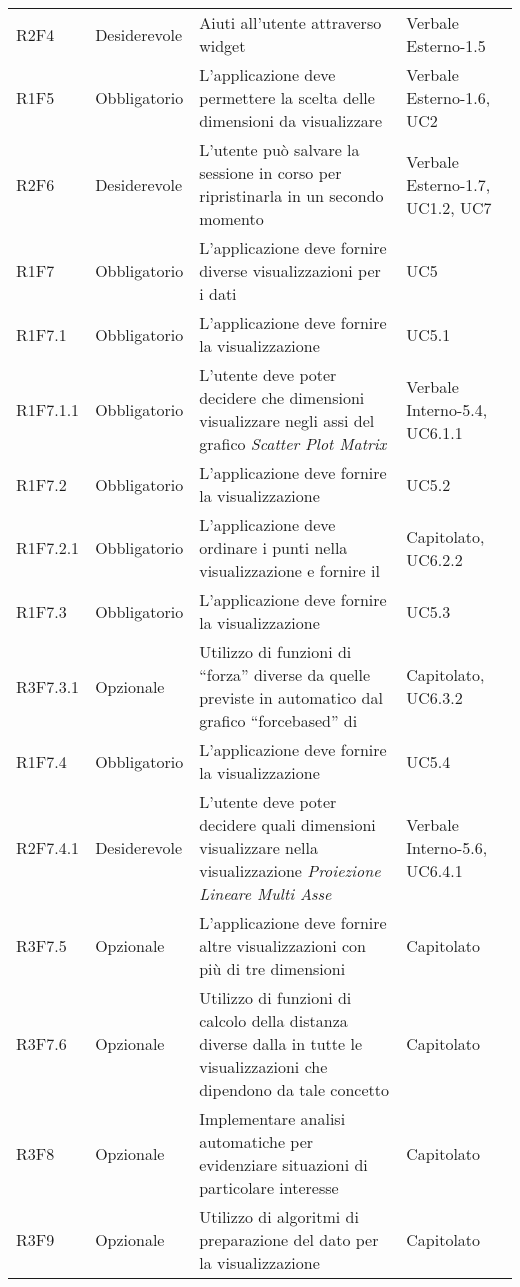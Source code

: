 \begin{center}
\begin{longtable}{C{2cm} | C{3cm} | C{7cm} | C{3.3cm}}
R2F4 & Desiderevole & Aiuti all'utente attraverso widget & Verbale Esterno-1.5 \\
R1F5 & Obbligatorio & L'applicazione deve permettere la scelta delle dimensioni da visualizzare & Verbale Esterno-1.6, UC2\\
R2F6 & Desiderevole & L'utente può salvare la sessione in corso per ripristinarla in un secondo momento & Verbale Esterno-1.7, UC1.2, UC7\\
R1F7 & Obbligatorio & L'applicazione deve fornire diverse visualizzazioni per i dati & UC5\\
R1F7.1 & Obbligatorio & L'applicazione deve fornire la visualizzazione  & UC5.1\\
R1F7.1.1 & Obbligatorio & L'utente deve poter decidere che dimensioni visualizzare negli assi del grafico \textit{Scatter Plot Matrix} & Verbale Interno-5.4, UC6.1.1\\
R1F7.2 & Obbligatorio & L'applicazione deve fornire la visualizzazione  & UC5.2\\
R1F7.2.1 & Obbligatorio & L'applicazione deve ordinare i punti nella visualizzazione  e fornire il  & Capitolato, UC6.2.2 \\
R1F7.3 & Obbligatorio & L'applicazione deve fornire la visualizzazione  & UC5.3\\
R3F7.3.1 & Opzionale & Utilizzo di funzioni di “forza” diverse da quelle previste in automatico dal grafico “forcebased” di  & Capitolato, UC6.3.2\\
R1F7.4 & Obbligatorio & L'applicazione deve fornire la visualizzazione  & UC5.4 \\
R2F7.4.1 & Desiderevole & L'utente deve poter decidere quali dimensioni visualizzare nella visualizzazione \textit{Proiezione Lineare Multi Asse} & Verbale Interno-5.6, UC6.4.1\\
R3F7.5 & Opzionale & L'applicazione deve fornire altre visualizzazioni con più di tre dimensioni & Capitolato\\
R3F7.6 & Opzionale & Utilizzo di funzioni di calcolo della distanza diverse dalla  in tutte le visualizzazioni che dipendono da tale concetto & Capitolato \\
R3F8 & Opzionale & Implementare analisi automatiche per evidenziare situazioni di particolare interesse & Capitolato\\
R3F9 & Opzionale & Utilizzo di algoritmi di preparazione del dato per la visualizzazione & Capitolato\\

\end{longtable}
\end{center}
